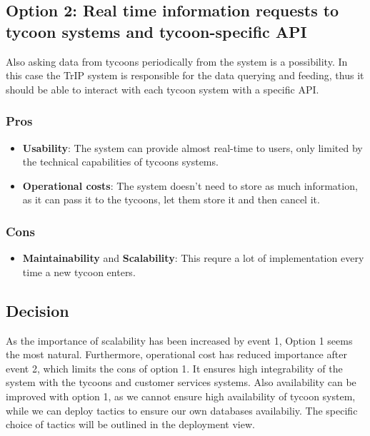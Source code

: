 \subsection*{Option 2: Real time information requests to tycoon systems and tycoon-specific API}
Also asking data from tycoons periodically from the system is a possibility. In this case the TrIP system is
responsible for the data querying and feeding, thus it should be able to interact with each tycoon system with a specific API.
\subsubsection*{Pros}
\begin{itemize}[noitemsep]
    \item \textbf{Usability}: The system can provide almost real-time to users, only limited by the technical capabilities of tycoons systems.
    \item \textbf{Operational costs}: The system doesn't need to store as much information, as it can pass it to the tycoons, let them store it and then cancel it.
\end{itemize}
\subsubsection*{Cons}
\begin{itemize}[noitemsep]
    \item \textbf{Maintainability} and \textbf{Scalability}: This requre a lot of implementation every time a new tycoon enters.
\end{itemize}

\subsection*{Decision}
As the importance of scalability has been increased by event 1, Option 1 seems the most natural.
Furthermore, operational cost has reduced importance after event 2, which limits the cons of option 1.
It ensures high integrability of the system with the tycoons and customer services systems.
Also availability can be improved with option 1, as we cannot ensure high availability of tycoon system, while we can deploy tactics to ensure our own databases availabiliy. The specific choice of tactics will be outlined in the deployment view.

